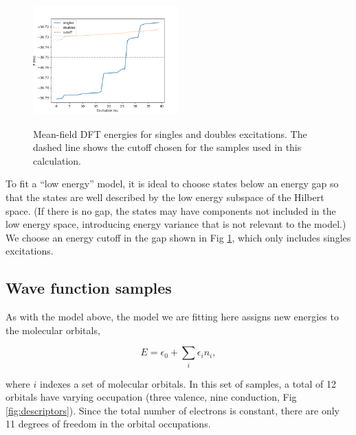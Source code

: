 \begin{figure}[h!]
\includegraphics[width=0.5\textwidth]{images/determinant_mf_energies.png}
\label{fig:energy_cutoff}
\caption{Mean-field DFT energies for singles and doubles excitations.
The dashed line shows the cutoff chosen for the samples used in this calculation.}
\end{figure}

To fit a ``low energy'' model, it is ideal to choose states below an energy gap so that the states are well described by the low energy subspace of the Hilbert space.
(If there is no gap, the states may have components not included in the low energy space, introducing energy variance that is not relevant to the model.)
We choose an energy cutoff in the gap shown in Fig \ref{fig:energy_cutoff}, which only includes singles excitations.

\subsection{Wave function samples}

As with the model above, the model we are fitting here assigns new energies to the molecular orbitals,

\begin{equation}
E = \epsilon_0 + \sum_i \epsilon_i n_i,
\end{equation}

where $i$ indexes a set of molecular orbitals.
In this set of samples, a total of 12 orbitals have varying occupation (three valence, nine conduction, Fig \ref{fig:descriptors}).
Since the total number of electrons is constant, there are only 11 degrees of freedom in the orbital occupations.


